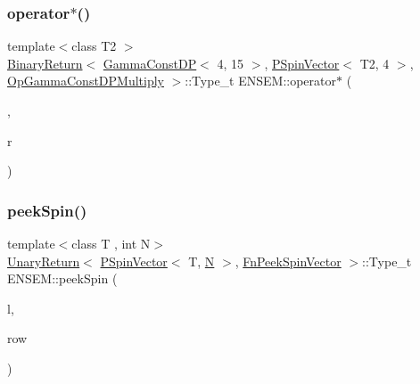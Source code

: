 \subsubsection{\texorpdfstring{operator$\ast$()}{operator*()}\hspace{0.1cm}{\footnotesize\ttfamily [32/32]}}
{\footnotesize\ttfamily template$<$class T2 $>$ \\
\mbox{\hyperlink{structENSEM_1_1BinaryReturn}{Binary\+Return}}$<$ \mbox{\hyperlink{classENSEM_1_1GammaConstDP}{Gamma\+Const\+DP}}$<$ 4, 15 $>$, \mbox{\hyperlink{classENSEM_1_1PSpinVector}{P\+Spin\+Vector}}$<$ T2, 4 $>$, \mbox{\hyperlink{structENSEM_1_1OpGammaConstDPMultiply}{Op\+Gamma\+Const\+D\+P\+Multiply}} $>$\+::Type\+\_\+t E\+N\+S\+E\+M\+::operator$\ast$ (\begin{DoxyParamCaption}\item[{const \mbox{\hyperlink{classENSEM_1_1GammaConstDP}{Gamma\+Const\+DP}}$<$ 4, 15 $>$ \&}]{,  }\item[{const \mbox{\hyperlink{classENSEM_1_1PSpinVector}{P\+Spin\+Vector}}$<$ T2, 4 $>$ \&}]{r }\end{DoxyParamCaption})\hspace{0.3cm}{\ttfamily [inline]}}

\mbox{\label{group__primspinvector_gad13d4acbc90e4d69a8528585ad1c35c8}} 
\subsubsection{\texorpdfstring{peekSpin()}{peekSpin()}}
{\footnotesize\ttfamily template$<$class T , int N$>$ \\
\mbox{\hyperlink{structENSEM_1_1UnaryReturn}{Unary\+Return}}$<$ \mbox{\hyperlink{classENSEM_1_1PSpinVector}{P\+Spin\+Vector}}$<$ T, \mbox{\hyperlink{adat__devel_2lib_2hadron_2operator__name__util_8cc_a7722c8ecbb62d99aee7ce68b1752f337}{N}} $>$, \mbox{\hyperlink{structENSEM_1_1FnPeekSpinVector}{Fn\+Peek\+Spin\+Vector}} $>$\+::Type\+\_\+t E\+N\+S\+E\+M\+::peek\+Spin (\begin{DoxyParamCaption}\item[{const \mbox{\hyperlink{classENSEM_1_1PSpinVector}{P\+Spin\+Vector}}$<$ T, \mbox{\hyperlink{adat__devel_2lib_2hadron_2operator__name__util_8cc_a7722c8ecbb62d99aee7ce68b1752f337}{N}} $>$ \&}]{l,  }\item[{int}]{row }\end{DoxyParamCaption})\hspace{0.3cm}{\ttfamily [inline]}}

